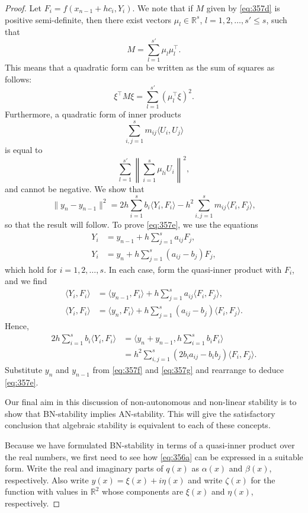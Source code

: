 \begin{proof}
Let $F_i = f(x_{n-1} + h c_i, Y_i)$. We note that if $M$ given by \eqref{eq:357d} is positive semi-definite, then there exist vectors $\mu_l \in \mathbb{R}^s$, $l = 1, 2, \dots, s' \leq s$, such that
\[
M = \sum_{l=1}^{s'} \mu_l \mu_l^\top.
\]
This means that a quadratic form can be written as the sum of squares as follows:
\[
\xi^\top M \xi = \sum_{l=1}^{s'} (\mu_l^\top \xi)^2.
\]
Furthermore, a quadratic form of inner products
\[
\sum_{i,j=1}^s m_{ij} \langle U_i, U_j \rangle
\]
is equal to
\[
\sum_{l=1}^{s'} \left\| \sum_{i=1}^s \mu_{li} U_i \right\|^2,
\]
and cannot be negative. We show that
\[
\| y_n - y_{n-1} \|^2 = 2h \sum_{i=1}^s b_i \langle Y_i, F_i \rangle - h^2 \sum_{i,j=1}^s m_{ij} \langle F_i, F_j \rangle, \tag{357e}
\]
so that the result will follow. To prove \eqref{eq:357e}, we use the equations
\begin{align}
Y_i &= y_{n-1} + h \sum_{j=1}^s a_{ij} F_j, \tag{357f} \\
Y_i &= y_n + h \sum_{j=1}^s (a_{ij} - b_j) F_j, \tag{357g}
\end{align}
which hold for $i = 1, 2, \dots, s$. In each case, form the quasi-inner product with $F_i$, and we find
\begin{align*}
\langle Y_i, F_i \rangle &= \langle y_{n-1}, F_i \rangle + h \sum_{j=1}^s a_{ij} \langle F_i, F_j \rangle, \\
\langle Y_i, F_i \rangle &= \langle y_n, F_i \rangle + h \sum_{j=1}^s (a_{ij} - b_j) \langle F_i, F_j \rangle.
\end{align*}
Hence,
\begin{align*}
2h \sum_{i=1}^s b_i \langle Y_i, F_i \rangle &= \langle y_n + y_{n-1}, h \sum_{i=1}^s b_i F_i \rangle \\
&= h^2 \sum_{i,j=1}^s (2b_i a_{ij} - b_i b_j) \langle F_i, F_j \rangle.
\end{align*}
Substitute $y_n$ and $y_{n-1}$ from \eqref{eq:357f} and \eqref{eq:357g} and rearrange to deduce \eqref{eq:357e}.

Our final aim in this discussion of non-autonomous and non-linear stability is to show that BN-stability implies AN-stability. This will give the satisfactory conclusion that algebraic stability is equivalent to each of these concepts.

Because we have formulated BN-stability in terms of a quasi-inner product over the real numbers, we first need to see how \eqref{eq:356a} can be expressed in a suitable form. Write the real and imaginary parts of $q(x)$ as $\alpha(x)$ and $\beta(x)$, respectively. Also write $y(x) = \xi(x) + i\eta(x)$ and write $\zeta(x)$ for the function with values in $\mathbb{R}^2$ whose components are $\xi(x)$ and $\eta(x)$, respectively.


\end{proof}
